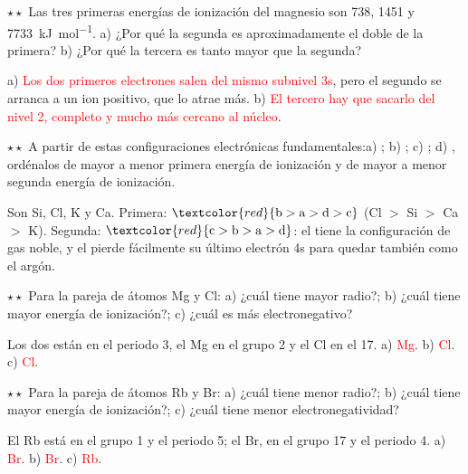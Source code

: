 \begin{exercise}
    \(\star\star\) Las tres primeras energías de ionización del magnesio son 738, 1451 y \qty{7733}{\kilo\joule\per\mol}.
    a) ¿Por qué la segunda es aproximadamente el doble de la primera? b) ¿Por qué la tercera es tanto mayor que la segunda?
    \begin{solu}
        a) \textcolor{red}{Los dos primeros electrones salen del mismo subnivel 3s}, pero el segundo se arranca a un ion positivo,
        que lo atrae más. b) \textcolor{red}{El tercero hay que sacarlo del nivel 2, completo y mucho más cercano al núcleo}.
    \end{solu}
\end{exercise}

\begin{exercise}
    \(\star\star\) A partir de estas configuraciones electrónicas fundamentales:\newline a) ;
    b) ; c) ; d) ,
    ordénalos de mayor a menor primera energía de ionización y de mayor a menor segunda energía de ionización.
    \begin{solu}
        Son Si, Cl, K y Ca. Primera: \(\textcolor{red}{\mathrm{b} > \mathrm{a} > \mathrm{d} > \mathrm{c}}\) (Cl \(>\) Si \(>\)
        Ca \(>\) K). Segunda: \(\textcolor{red}{\mathrm{c} > \mathrm{b} > \mathrm{a} > \mathrm{d}}\): el  tiene la
        configuración de gas noble, y el  pierde fácilmente su último electrón 4s para quedar también como el argón.
    \end{solu}
\end{exercise}

\begin{exercise}
    \(\star\star\) Para la pareja de átomos Mg y Cl: a) ¿cuál tiene mayor radio?; b) ¿cuál tiene mayor energía de ionización?;
    c) ¿cuál es más electronegativo?
    \begin{solu}
        Los dos están en el periodo 3, el Mg en el grupo 2 y el Cl en el 17. a) \textcolor{red}{Mg}. b) \textcolor{red}{Cl}.
        c) \textcolor{red}{Cl}.
    \end{solu}
\end{exercise}

\begin{exercise}
    \(\star\star\) Para la pareja de átomos Rb y Br: a) ¿cuál tiene menor radio?; b) ¿cuál tiene mayor energía de ionización?;
    c) ¿cuál tiene menor electronegatividad?
    \begin{solu}
        El Rb está en el grupo 1 y el periodo 5; el Br, en el grupo 17 y el periodo 4. a) \textcolor{red}{Br}. b)
        \textcolor{red}{Br}. c) \textcolor{red}{Rb}.
    \end{solu}
\end{exercise}

